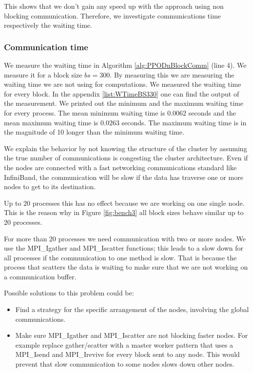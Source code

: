 This shows that we don't gain any speed up with the approach using non blocking communication.
Therefore, we investigate communications time respectively the waiting time.  
\subsubsection{Communication time}
We measure the waiting time in Algorithm \ref{alg:PPODnBlockComm} (line 4).
We measure it for a block size $ bs = 300 $. 
By measuring this we are measuring the waiting time we are not using for computations.
We measured the waiting time for every block.
In the appendix \ref{list:WTimeBS330} one can find the output of the measurement. We printed out the minimum and the maximum waiting time for every process.
The mean minimum waiting time is $0.0062$ seconds and the mean maximum waiting time is $0.0263$ seconds. 
The maximum waiting time is in the magnitude of 10 longer than the minimum waiting time.

We explain the behavior by not knowing the structure of the cluster
by assuming the true number of communications is congesting the cluster architecture.
Even if the nodes are connected with a fast networking communications standard like InfiniBand, the communication will be slow if the data has traverse one or more nodes to get to its destination.

Up to 20 processes this has no effect because we are working on one single node. This is the reason why in Figure \ref{fig:bench3} all block sizes behave similar up to 20 processes.

For more than 20 processes we need communication with two or more nodes.
We use the MPI\_Igather and MPI\_Iscatter functions; this leads to a slow down for all processes if the communication to one method is slow. 
That is because the process that scatters the data is waiting to make sure that we are not working on a communication buffer.

Possible solutions to this problem could be:
\begin{itemize}
	\item Find a strategy for the specific arrangement of the nodes, involving the global communications.
	\item Make sure MPI\_Igather and MPI\_Iscatter are not blocking faster nodes.
	For example replace gather/scatter with a master worker pattern that uses a MPI\_Isend and MPI\_Irevive for every block sent to any node. This would prevent that slow communication to some nodes slows down other nodes.
\end{itemize}

